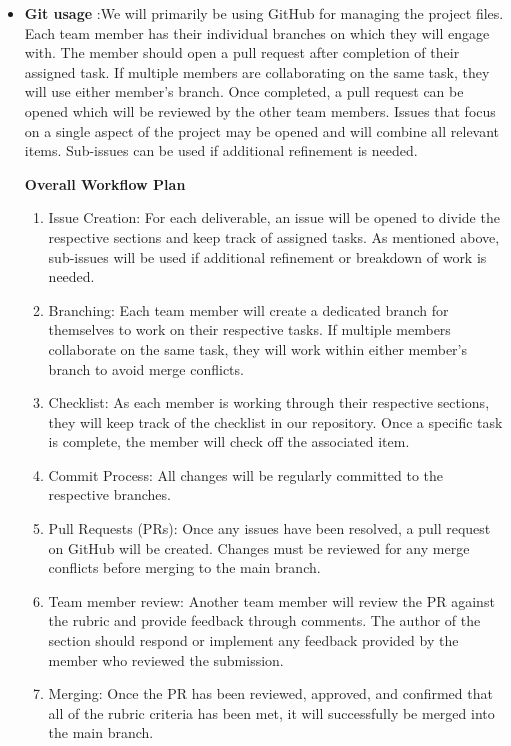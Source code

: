 \documentclass{article}
\begin{document}
\begin{itemize}
	\item \textbf{Git usage} :We will primarily be using GitHub for managing the project files.
Each team member has their individual branches on which they will engage with. 
The member should open a pull request after completion of their assigned task. If 
multiple members are collaborating on the same task, they will use either member's branch. Once completed, 
a pull request can be opened which will be reviewed by the other team members. 
Issues that focus on a single aspect of the project may be opened and will combine
all relevant items. Sub-issues can be used if additional refinement is needed. 

\textbf{Overall Workflow Plan}
\begin{enumerate}
 \item Issue Creation: For each deliverable, an issue will be opened to divide the respective sections and keep track of assigned tasks.
 As mentioned above, sub-issues will be used if additional refinement or breakdown of work is needed.
 \item Branching: Each team member will create a dedicated branch for themselves to work on their respective tasks. If multiple members
 collaborate on the same task, they will work within either member’s branch to avoid merge conflicts.
 \item Checklist: As each member is working through their respective sections, they will keep track of the checklist in our repository.
 Once a specific task is complete, the member will check off the associated item.
 \item Commit Process: All changes will be regularly committed to the respective branches.
 \item Pull Requests (PRs): Once any issues have been resolved, a pull request on GitHub will be created. Changes must be reviewed for
 any merge conflicts before merging to the main branch.
 \item Team member review: Another team member will review the PR against the rubric and provide feedback through comments. The author
 of the section should respond or implement any feedback provided by the member who reviewed the submission.
 \item Merging: Once the PR has been reviewed, approved, and confirmed that all of the rubric criteria has been met, it will successfully
 be merged into the main branch.
\end{enumerate}


\end{itemize}
\end{document}
